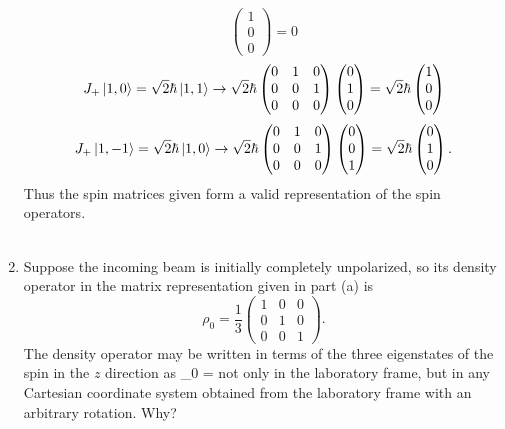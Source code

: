 \documentclass[11pt,letterpaper]{article}
\begin{document}
\begin{enumerate}[label=\Roman*.]
\[			\begin{pmatrix}1\\0\\0\end{pmatrix} = 0
		\]
		\[
			J_+\ket{1,0} = \sqrt 2\hbar\ket{1,1} \to \sqrt 2\hbar \begin{pmatrix}0&1&0\\0&0&1\\0&0&0\end{pmatrix}
			\begin{pmatrix}0\\1\\0\end{pmatrix} = \sqrt 2\hbar \begin{pmatrix}1\\0\\0\end{pmatrix}
		\]
		\[
			J_+\ket{1,-1} = \sqrt 2\hbar\ket{1,0} \to \sqrt 2\hbar \begin{pmatrix}0&1&0\\0&0&1\\0&0&0\end{pmatrix}
			\begin{pmatrix}0\\0\\1\end{pmatrix} = \sqrt 2\hbar \begin{pmatrix}0\\1\\0\end{pmatrix}.
		\]
		Thus the spin matrices given form a valid representation of the spin operators. 
		\\
		\\
		\item
		Suppose the incoming beam is initially completely unpolarized, so its density operator in the matrix 
		representation given in part (a) is 
		\[
			\rho_0 = \frac{1}{3}\begin{pmatrix}1&0&0\\0&1&0\\0&0&1\end{pmatrix}.
		\]
		The density operator may be written in terms of the three eigenstates of the spin in the $z$ direction as
		\be\label{1}
			\rho_0 = 
		\ee
		not only in the laboratory frame, but in any Cartesian coordinate system obtained from the laboratory frame with an arbitrary 
		rotation. Why?
		\\
		\\

\end{enumerate}
\end{document}

